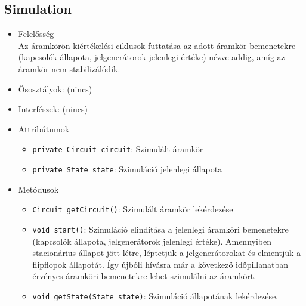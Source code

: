 \subsection{Simulation}
\begin{itemize}
\item Felelősség\\
Az áramkörön kiértékelési ciklusok futtatása az adott áramkör bemenetekre (kapcsolók állapota, jelgenerátorok jelenlegi értéke) nézve addig, amíg az áramkör nem stabilizálódik.
\item Ősosztályok: (nincs)
\item Interfészek: (nincs)
\item Attribútumok $\ $
\begin{itemize}
	\item \texttt{private Circuit circuit}: Szimulált áramkör
	\item \texttt{private State state}: Szimuláció jelenlegi állapota
\end{itemize}
\item Metódusok$\ $
\begin{itemize}
	\item \texttt{Circuit getCircuit()}: Szimulált áramkör lekérdezése
	\item \texttt{void start()}: Szimuláció elindítása a jelenlegi áramköri bemenetekre (kapcsolók állapota, jelgenerátorok jelenlegi értéke). Amennyiben stacionárius állapot jött létre, léptetjük a jelgenerátorokat és elmentjük a flipflopok állapotát. Így újbóli hívásra már a következő időpillanatban érvényes áramköri bemenetekre lehet szimulálni az áramkört.
	\item \texttt{void getState(State state)}: Szimuláció állapotának lekérdezése.
\end{itemize}
\end{itemize}

